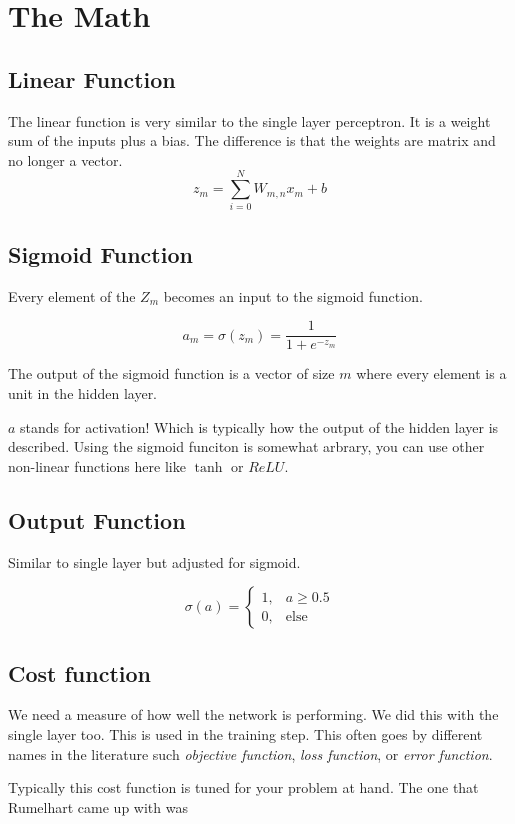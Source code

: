 \documentclass[letterpaper,12pt]{article}
\begin{document}
\section{The Math}

\subsection{Linear Function}
The linear function is very similar to the single layer perceptron. It is a
weight sum of the inputs plus a bias. The difference is that the weights are
matrix and no longer a vector.
\[
    z_m = \sum_{i=0}^{N} W_{m,n} x_m + b
\]

\subsection{Sigmoid Function}
Every element of the $Z_m$ becomes an input to the sigmoid function.

\[
    a_m = \sigma(z_m) = \frac{1}{1 + e^{-z_m}}
\]

The output of the sigmoid function is a vector of size $m$ where every element
is a unit in the hidden layer.

$a$ stands for activation! Which is typically how the output of the hidden layer
is described. Using the sigmoid funciton is somewhat arbrary, you can use other
non-linear functions here like $\tanh$ or $ReLU$.

\subsection{Output Function}

Similar to single layer but adjusted for sigmoid.

\[
    \sigma(a) =
    \begin{cases}
        1, & a \ge 0.5\\
        0, & \text{else}
    \end{cases}
\]

\subsection{Cost function}

We need a measure of how well the network is performing. We did this with the
single layer too. This is used in the training step. This often goes by
different names in the literature such \emph{objective function}, \emph{loss
function}, or \emph{error function}.

Typically this cost function is tuned for your problem at hand. The one that
Rumelhart came up with was
\end{document}
